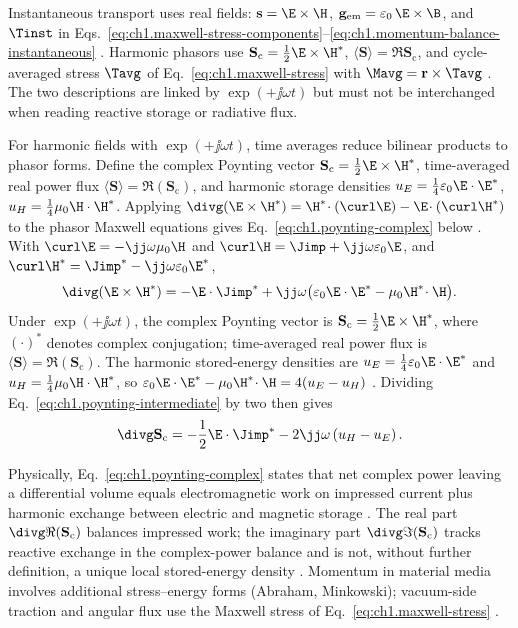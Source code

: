 Instantaneous transport uses real fields: $\mathbf{s}=\E\times\H$, $\mathbf{g}_{\mathrm{em}}=\varepsilon_0\,\E\times\B$, and $\Tinst$ in Eqs.~\eqref{eq:ch1.maxwell-stress-components}--\eqref{eq:ch1.momentum-balance-instantaneous} \cite{maxwell1873,poynting1884}. Harmonic phasors use $\mathbf{S}_\mathrm{c}=\tfrac12\E\times\H^*$, $\langle\mathbf{S}\rangle=\Re\mathbf{S}_\mathrm{c}$, and cycle-averaged stress $\Tavg$ of Eq.~\eqref{eq:ch1.maxwell-stress} with $\Mavg=\mathbf{r}\times\Tavg$ \cite{stratton1941}. The two descriptions are linked by $\exp(+\jj\omega t)$ but must not be interchanged when reading reactive storage or radiative flux.

For harmonic fields with $\exp(+\jj\omega t)$, time averages reduce bilinear products to
phasor forms. Define the complex Poynting vector
$\mathbf{S}_\mathrm{c}=\tfrac12\E\times\H^*$, time-averaged real power flux
$\langle\mathbf{S}\rangle=\Re(\mathbf{S}_\mathrm{c})$, and harmonic storage densities
$u_E=\tfrac14\varepsilon_0\E\cdot\E^*$, $u_H=\tfrac14\mu_0\H\cdot\H^*$. Applying
$\divg(\E\times\H^*)=\H^*\!\cdot(\curl\E)-\E\!\cdot(\curl\H^*)$ to the phasor Maxwell
equations gives Eq.~\eqref{eq:ch1.poynting-complex} below \cite{stratton1941,harrington2001}.
With $\curl\E=-\jj\omega\mu_0\H$ and
$\curl\H=\Jimp+\jj\omega\varepsilon_0\E$, and $\curl\H^*=\Jimp^*-\jj\omega\varepsilon_0\E^*$,
\begin{equation}
\label{eq:ch1.poynting-intermediate}
\divg(\E\times\H^*)
=-\E\cdot\Jimp^*
+\jj\omega\bigl(\varepsilon_0\E\cdot\E^*-\mu_0\H^*\!\cdot\H\bigr).
\end{equation}
Under $\exp(+\jj\omega t)$, the complex Poynting vector is
\(\mathbf{S}_\mathrm{c}=\tfrac{1}{2}\E\times\H^*\), where \((\cdot)^*\) denotes complex
conjugation; time-averaged real power flux is
\(\langle\mathbf{S}\rangle=\Re(\mathbf{S}_\mathrm{c})\). The harmonic stored-energy
densities are
\(u_E=\tfrac{1}{4}\varepsilon_0\E\cdot\E^*\) and
\(u_H=\tfrac{1}{4}\mu_0\H\cdot\H^*\), so
$\varepsilon_0\E\cdot\E^*-\mu_0\H^*\!\cdot\H=4(u_E-u_H)$ \cite{stratton1941}.
Dividing Eq.~\eqref{eq:ch1.poynting-intermediate} by two then gives
\begin{equation}
\label{eq:ch1.poynting-average}\divg\mathbf{S}_\mathrm{c}
=-\frac{1}{2}\E\cdot\Jimp^*
-2\jj\omega\left(u_H-u_E\right).
\end{equation}
\addtocounter{equation}{-1}\label{eq:ch1.dual-invariant-poynting}%
\addtocounter{equation}{-1}\label{eq:ch1.poynting-complex}%
Physically, Eq.~\eqref{eq:ch1.poynting-complex} states that net complex power leaving a differential volume equals electromagnetic work on impressed current plus harmonic exchange between electric and magnetic storage \cite{poynting1884}. The real part $\divg\Re(\mathbf{S}_\mathrm{c})$ balances impressed work; the imaginary part $\divg\Im(\mathbf{S}_\mathrm{c})$ tracks reactive exchange in the complex-power balance and is not, without further definition, a unique local stored-energy density \cite{stratton1941}. Momentum in material media involves additional stress--energy forms (Abraham, Minkowski); vacuum-side traction and angular flux use the Maxwell stress of Eq.~\eqref{eq:ch1.maxwell-stress} \cite{abraham1910,minkowski1908,stratton1941}.

